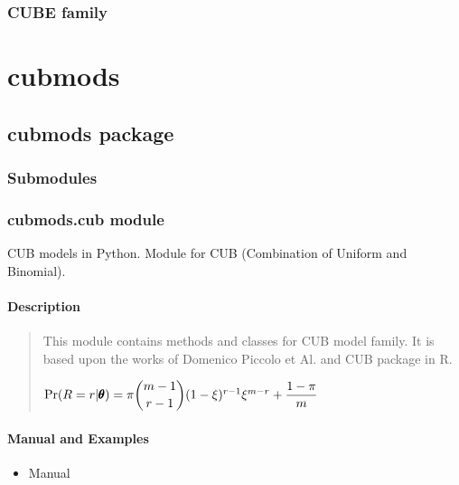 \documentclass[letterpaper,10pt,english]{sphinxmanual}
\begin{document}
\subsection{CUBE family}
\label{\detokenize{manual:id164}}
\sphinxstepscope


\chapter{cubmods}
\label{\detokenize{modules:cubmods}}\label{\detokenize{modules::doc}}
\sphinxstepscope


\section{cubmods package}
\label{\detokenize{cubmods:cubmods-package}}\label{\detokenize{cubmods::doc}}

\subsection{Submodules}
\label{\detokenize{cubmods:submodules}}

\subsection{cubmods.cub module}
\label{\detokenize{cubmods:module-cubmods.cub}}\label{\detokenize{cubmods:cubmods-cub-module}}
\sphinxAtStartPar
CUB models in Python.
Module for CUB (Combination of Uniform
and Binomial).


\subsubsection{Description}
\label{\detokenize{cubmods:description}}\begin{quote}

\sphinxAtStartPar
This module contains methods and classes
for CUB model family.
It is based upon the works of Domenico
Piccolo et Al. and CUB package in R.

\sphinxAtStartPar
\(\Pr(R=r|\pmb{\theta}) = \pi \dbinom{m-1}{r-1}(1-\xi)^{r-1}\xi^{m-r}+\dfrac{1-\pi}{m}\)
\end{quote}


\subsubsection{Manual and Examples}
\label{\detokenize{cubmods:manual-and-examples}}\begin{itemize}
\item {} 
\sphinxAtStartPar
Manual 

\end{itemize}
\end{document}
